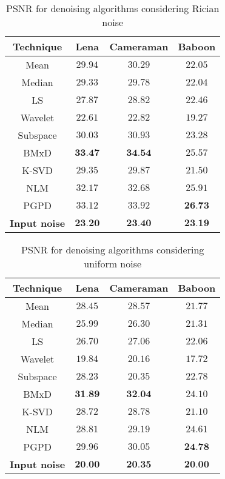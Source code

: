 \begin{table}[H]
	\centering
	\caption{PSNR for denoising algorithms considering Rician noise}
	\begin{tabular}{|c|c|c|c|}
	\hline
	\textbf{Technique} & \textbf{Lena} & \textbf{Cameraman} & \textbf{Baboon} \\ \hline
	Mean & $29.94$ & $30.29$ & $22.05$ \\ \hline
	Median & $29.33$ & $29.78$ & $22.04$ \\ \hline
	LS & $27.87$ & $28.82$ & $22.46$ \\ \hline
	Wavelet & $22.61$ & $22.82$ & $19.27$ \\ \hline
	Subspace & $30.03$ & $30.93$ & $23.28$ \\ \hline
	BMxD & $\textbf{33.47}$ & $\textbf{34.54}$& $25.57$\\ \hline
	K-SVD & $29.35$  & $29.87$ & $21.50$ \\ \hline
	NLM & $32.17$ & $32.68$ & $25.91$ \\ \hline
	PGPD &$33.12$&$33.92$ & $\textbf{26.73}$ \\ \hline
	\textbf{Input noise} & $\textbf{23.20}$ & $\textbf{23.40}$ & $\textbf{23.19}$ \\ \hline
	\end{tabular}
	\label{tab:numerical_results_rician}
\end{table}

\begin{table}[H]
	\centering
	\caption{PSNR for denoising algorithms considering uniform noise}
	\begin{tabular}{|c|c|c|c|}
	\hline
	\textbf{Technique} & \textbf{Lena} & \textbf{Cameraman} & \textbf{Baboon} \\ \hline
	Mean & $28.45$ & $28.57$ & $21.77$ \\ \hline
	Median & $25.99$ & $26.30$ & $21.31$ \\ \hline
	LS & $26.70$ & $27.06$ & $22.06$ \\ \hline
	Wavelet & $19.84$ & $20.16$ & $17.72$\\ \hline
	Subspace & $28.23$ & $20.35$ & $22.78$ \\ \hline
	BMxD & $\textbf{31.89}$ & $\textbf{32.04}$& $24.10$\\ \hline
	K-SVD & $28.72$ & $28.78$ & $21.10$ \\ \hline
	NLM & $28.81$ & $29.19$ & $24.61$ \\ \hline
	PGPD & $29.96$& $30.05$ & $\textbf{24.78}$ \\ \hline
	\textbf{Input noise} & $\textbf{20.00}$ & $\textbf{20.35}$ & $\textbf{20.00}$ \\ \hline
	\end{tabular}
	\label{tab:numerical_results_uniform}
\end{table}

